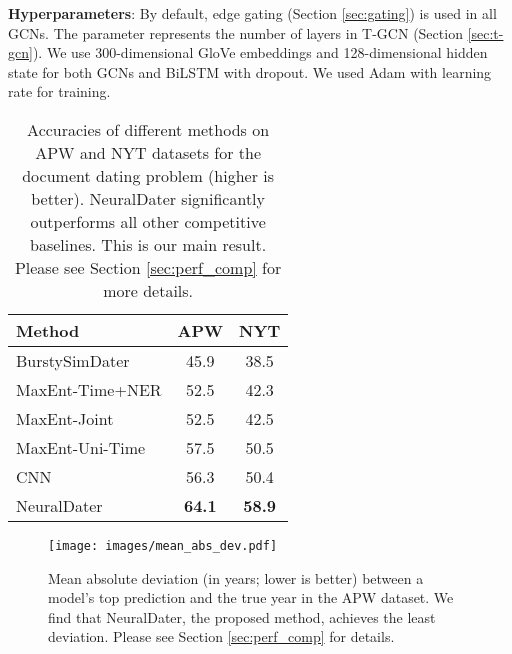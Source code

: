 \documentclass[11pt,a4paper]{article}
\newcommand{\refsec}[1]{Section \ref{#1}}
\newcommand{\method}{NeuralDater}
\begin{document}
\textbf{Hyperparameters}: By default, edge gating (\refsec{sec:gating}) is used in all GCNs. The parameter  represents the number of layers in T-GCN (\refsec{sec:t-gcn}). We use 300-dimensional GloVe embeddings and 128-dimensional hidden state for both GCNs and BiLSTM with  dropout. We used Adam \cite{adam_optimizer} with  learning rate for training. 

\begin{table}[t]
	\centering
	\begin{tabular}{lcc}
		\toprule
		Method 			 & APW & NYT \\
		\midrule		
		\addlinespace
		BurstySimDater 		& 45.9 & 38.5 \\
		MaxEnt-Time+NER		& 52.5 & 42.3 \\
		MaxEnt-Joint		& 52.5 & 42.5 \\
		MaxEnt-Uni-Time		& 57.5 & 50.5 \\
		CNN 				& 56.3 & 50.4 \\
		\method{}			& \textbf{64.1} & \textbf{58.9} \\
		\bottomrule
	\end{tabular}
	\caption{\label{tb:result_main}Accuracies of different methods on APW and NYT datasets for the document dating problem (higher is better). \method{} significantly outperforms all other competitive baselines. This is our main result. Please see \refsec{sec:perf_comp} for more details.}

\end{table}

\begin{figure}[t]
	\centering
	\texttt{[image: images/mean\_abs\_dev.pdf]}
	\caption{\label{fig:results_mean_dev}Mean absolute deviation (in years; lower is better) between a model's top prediction and the true year in the APW dataset. We find that \method{}, the proposed method, achieves the least deviation. Please see \refsec{sec:perf_comp} for details. }
\end{figure}
\end{document}
